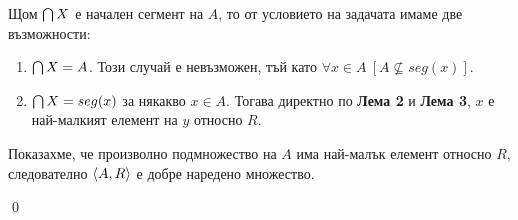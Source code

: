 \quad
Щом $\bigcap X$ е начален сегмент на $A$, то от условието на задачата имаме две възможности:
\begin{enumerate}[label={\arabic* сл.}]
\item
$\bigcap X = A$.
Този случай е невъзможен, тъй като $\forall x \in A\ [A \nsubseteq seg(x)]$.
\item
$\bigcap X = seg(x)$ за някакво $x \in A$.
Тогава директно по \textbf{Лема 2} и \textbf{Лема 3}, $x$ е най-малкият елемент на $y$ относно $R$.

%
%
%
%
%
%
%
%
%
%
\end{enumerate}

\quad
Показахме, че произволно подмножество на $A$ има най-малък елемент относно $R$,
следователно $\langle A, R \rangle$ е добре наредено множество.

\qed


